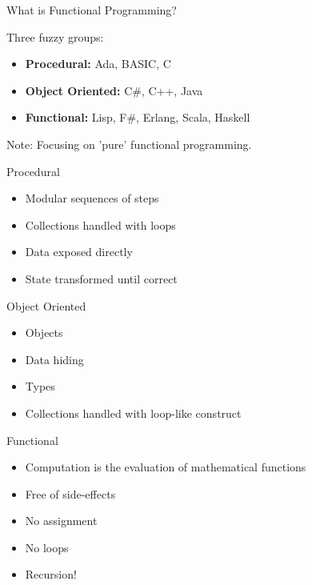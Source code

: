 \begin{frame}
  What is Functional Programming?
\end{frame}

\begin{frame}
  Three fuzzy groups:

  \begin{itemize}
    \item<1-> \textbf{Procedural:}      Ada, BASIC, C
    \item<2-> \textbf{Object Oriented:} C\#, C++, Java
    \item<3-> \textbf{Functional:}      Lisp, F\#, Erlang, Scala, Haskell
  \end{itemize}

  \pause
  \pause
  \pause

  Note: Focusing on 'pure' functional programming.
\end{frame}

\begin{frame}
  Procedural

  \begin{itemize}
    \item<1-> Modular sequences of steps
    \item<2-> Collections handled with loops
    \item<3-> Data exposed directly
    \item<4-> State transformed until correct
  \end{itemize}
\end{frame}

\begin{frame}[fragile]
  
\end{frame}

\begin{frame}
  Object Oriented

  \begin{itemize}
    \item<1-> Objects
    \item<2-> Data hiding
    \item<3-> Types
    \item<4-> Collections handled with loop-like construct
  \end{itemize}
\end{frame}

\begin{frame}
  Functional

  \begin{itemize}
    \item<1-> Computation is the evaluation of mathematical functions
    \item<2-> Free of side-effects
    \item<3-> No assignment
    \item<4-> No loops %
    \item<5-> Recursion!
  \end{itemize}
\end{frame}

